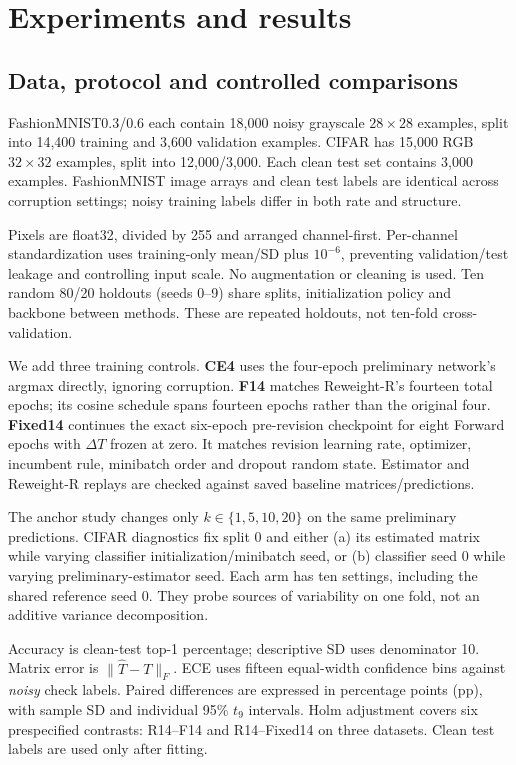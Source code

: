 \documentclass[12pt]{article}
\begin{document}
\section{Experiments and results}
\subsection{Data, protocol and controlled comparisons}
FashionMNIST0.3/0.6 each contain 18,000 noisy grayscale $28\times28$ examples, split into 14,400 training and 3,600 validation examples. CIFAR has 15,000 RGB $32\times32$ examples, split into 12,000/3,000. Each clean test set contains 3,000 examples. FashionMNIST image arrays and clean test labels are identical across corruption settings; noisy training labels differ in both rate and structure.

Pixels are float32, divided by 255 and arranged channel-first. Per-channel standardization uses training-only mean/SD plus $10^{-6}$, preventing validation/test leakage and controlling input scale. No augmentation or cleaning is used. Ten random 80/20 holdouts (seeds 0--9) share splits, initialization policy and backbone between methods. These are repeated holdouts, not ten-fold cross-validation.

We add three training controls. \textbf{CE4} uses the four-epoch preliminary network's argmax directly, ignoring corruption. \textbf{F14} matches Reweight-R's fourteen total epochs; its cosine schedule spans fourteen epochs rather than the original four. \textbf{Fixed14} continues the exact six-epoch pre-revision checkpoint for eight Forward epochs with $\Delta T$ frozen at zero. It matches revision learning rate, optimizer, incumbent rule, minibatch order and dropout random state. Estimator and Reweight-R replays are checked against saved baseline matrices/predictions.

The anchor study changes only $k\in\{1,5,10,20\}$ on the same preliminary predictions. CIFAR diagnostics fix split 0 and either (a) its estimated matrix while varying classifier initialization/minibatch seed, or (b) classifier seed 0 while varying preliminary-estimator seed. Each arm has ten settings, including the shared reference seed 0. They probe sources of variability on one fold, not an additive variance decomposition.

Accuracy is clean-test top-1 percentage; descriptive SD uses denominator 10. Matrix error is $\|\hat T-T\|_F$. ECE uses fifteen equal-width confidence bins against \emph{noisy} check labels. Paired differences are expressed in percentage points (pp), with sample SD and individual 95\% $t_9$ intervals. Holm adjustment covers six prespecified contrasts: R14--F14 and R14--Fixed14 on three datasets. Clean test labels are used only after fitting.
\end{document}
